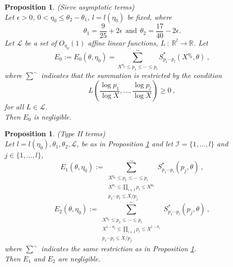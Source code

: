 \documentclass{amsart}
\newtheorem{proposition}[theorem]{Proposition}
\numberwithin{equation}{subsection}
\begin{document}
\begin{proposition}\label{prop41} (Sieve asymptotic terms)\\
Let $\epsilon>0$, $0<\eta_0\leq \theta_2-\theta_1$, $l=l(\eta_0)$ be fixed, where 
$$\theta_1=\frac{9}{25}+2\epsilon\ \  \text{and}\ \  \theta_2=\frac{17}{40}-2\epsilon.$$
Let $\mathcal{L}$ be a set of $O_{\eta_0}(1)$ affine linear functions, $L\::\: \mathbb{R}^l\rightarrow \mathbb{R}$. Let
$$E_0:=E_0(\theta, \eta_0)=\sum_{X^{\eta_0}\leq p_1\leq \cdots \leq p_l}^{\sim} S_{p_1\cdots p_l}^*(X^{\eta_0},\theta)\:,$$
where $\sum^\sim$ indicates that the summation is restricted by the condition 
$$L\left( \frac{\log p_1}{\log X},\ldots, \frac{\log p_l}{\log X}\right)\geq 0\:,$$
for all $L\in\mathcal{L}$.\\
Then $E_0$ is negligible.
\end{proposition}


\begin{proposition}\label{prop42} (Type II terms)\\
Let $l=l(\eta_0), \theta_1, \theta_2, \mathcal{L}$, be as in Proposition \ref{prop41} and let $\mathcal{I}=\{1,\ldots, l\}$ and \mbox{$j\in\{1,\ldots, l\}$,}
$$E_1(\theta, \eta_0):=\sum_{\substack{X^{\eta_0}\leq p_1\leq \cdots \leq p_l \\ X^{\theta_1}\leq \prod_{i\in I}p_i\leq X^{\theta_2}\\ p_1\cdots p_l\leq X/p_j}}^\sim  S_{p_1\cdots p_l}^*(p_j,\theta)\:,$$
%
$$E_2(\theta, \eta_0):=\sum_{\substack{X^{\eta_0}\leq p_1\leq \cdots \leq p_l \\ X^{1-\theta_2}\leq \prod_{i\in I}p_i\leq X^{1-\theta_1}\\ p_1\cdots p_l\leq X/p_j}}^\sim  S_{p_1\cdots p_l}^*(p_j,\theta)\:,$$
where $\sum^\sim$ indicates the same restriction as in Proposition \ref{prop41}.\\
Then $E_1$ and $E_2$ are negligible.
\end{proposition}
\end{document}
